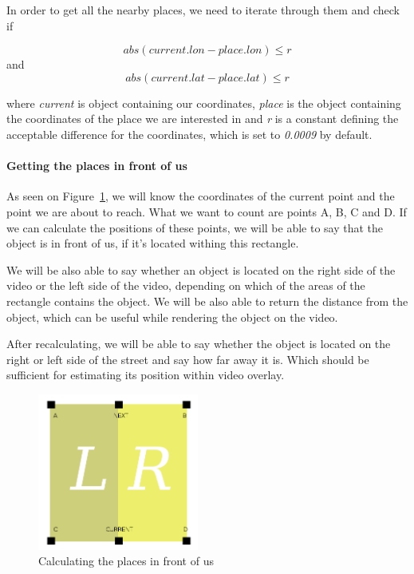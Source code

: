 \documentclass[journal]{IEEEtran}
\begin{document}
In order to get all the nearby places, we need to iterate through them and check if 


\begin{displaymath}
abs(current.lon - place.lon) \leq r
\end{displaymath}
and
\begin{displaymath}
abs(current.lat - place.lat) \leq r
\end{displaymath}

 where \textit{current} is object containing our coordinates, \textit{place} is the object containing the coordinates of the place we are interested in and \textit{r} is a constant defining the acceptable difference for the coordinates, which is set to \textit{0.0009} by default.

\paragraph{Getting the places in front of us}

As seen on Figure~\ref{filtering}, we will know the coordinates of the current point and the point we are about to reach. What we want to count are points A, B, C and D. If we can calculate the positions of these points, we will be able to say that the object is in front of us, if it's located withing this rectangle.

We will be also able to say whether an object is located on the right side of the video or the left side of the video, depending on which of the areas of the rectangle contains the object. We will be also able to return the distance from the object, which can be useful while rendering the object on the video.

After recalculating, we will be able to say whether the object is located on the right or left side of the street and say how far away it is. Which should be sufficient for estimating its position within video overlay.

        \begin{figure}[htb]
         \centering
         \includegraphics[width=200px]{filtering}
         \caption{Calculating the places in front of us}
         \label{filtering}
        \end{figure}
        
\end{document}
